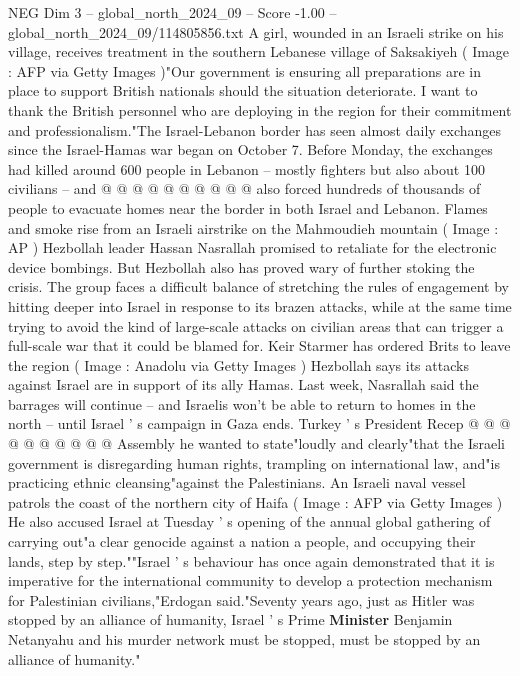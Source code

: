 \begin{textsample}{NEG Dim 3 – global\_north\_2024\_09 – Score -1.00 – global\_north\_2024\_09/114805856.txt}
A girl, wounded in an Israeli strike on his village, receives treatment in the southern Lebanese village of Saksakiyeh ( Image : AFP via Getty Images )"Our government is ensuring all preparations are in place to support British nationals should the situation deteriorate.
I want to thank the British personnel who are deploying in the region for their commitment and professionalism."The Israel-Lebanon border has seen almost daily exchanges since the Israel-Hamas war began on October 7.
Before Monday, the exchanges had killed around 600 people in Lebanon -- mostly fighters but also about 100 civilians -- and @ @ @ @ @ @ @ @ @ @ also forced hundreds of thousands of people to evacuate homes near the border in both Israel and Lebanon.
Flames and smoke rise from an Israeli airstrike on the Mahmoudieh mountain ( Image : AP ) Hezbollah leader Hassan Nasrallah promised to retaliate for the electronic device bombings.
But Hezbollah also has proved wary of further stoking the crisis.
The group faces a difficult balance of stretching the rules of engagement by hitting deeper into Israel in response to its brazen attacks, while at the same time trying to avoid the kind of large-scale attacks on civilian areas that can trigger a full-scale war that it could be blamed for.
Keir Starmer has ordered Brits to leave the region ( Image : Anadolu via Getty Images ) Hezbollah says its attacks against Israel are in support of its ally Hamas.
Last week, Nasrallah said the barrages will continue -- and Israelis won't be able to return to homes in the north -- until Israel ' s campaign in Gaza ends.
Turkey ' s President Recep @ @ @ @ @ @ @ @ @ @ Assembly he wanted to state"loudly and clearly"that the Israeli government is disregarding human rights, trampling on international law, and"is practicing ethnic cleansing"against the Palestinians.
An Israeli naval vessel patrols the coast of the northern city of Haifa ( Image : AFP via Getty Images ) He also accused Israel at Tuesday ' s opening of the annual global gathering of carrying out"a clear genocide against a nation a people, and occupying their lands, step by step.""Israel ' s behaviour has once again demonstrated that it is imperative for the international community to develop a protection mechanism for Palestinian civilians,"Erdogan said."Seventy years ago, just as Hitler was stopped by an alliance of humanity, Israel ' s Prime \textbf{Minister} Benjamin Netanyahu and his murder network must be stopped, must be stopped by an alliance of humanity."

\end{textsample}
